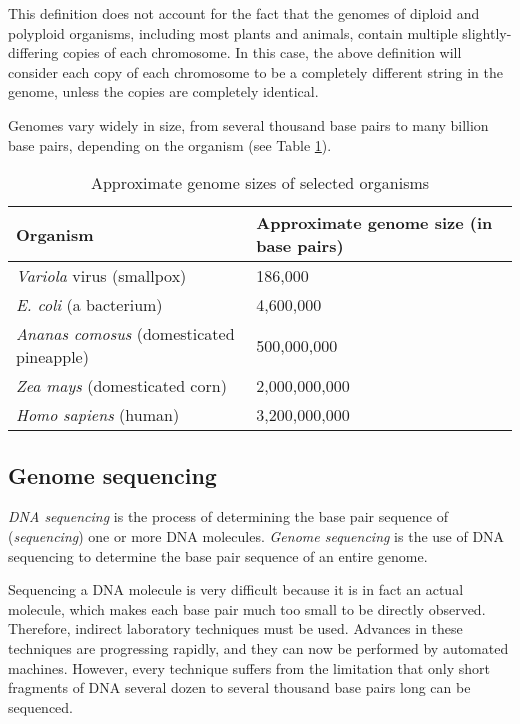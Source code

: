 \documentclass[10pt]{article}
\begin{document}
This definition does not account for the fact that the genomes of diploid and
polyploid organisms, including most plants and animals, contain multiple
slightly-differing copies of each chromosome.  In this case, the above
definition will consider each copy of each chromosome to be a completely
different string in the genome, unless the copies are completely identical.

Genomes vary widely in size, from several thousand base pairs to many billion
base pairs, depending on the organism (see Table \ref{tab:GenomeSizes}).

\begin{table}[H]
	\begin{center}
		\begin{tabular}{|l|p{4.5cm}|}
			\hline
			{\bf Organism} & {\bf Approximate genome size (in base
			pairs)} \\
			\hline
			{\it Variola} virus (smallpox) &  186,000 \\
			\hline
			{\it E. coli} (a bacterium) & 4,600,000 \\
			\hline
			{\it Ananas comosus} (domesticated pineapple) & 500,000,000 \\
			\hline
			{\it Zea mays} (domesticated corn) & 2,000,000,000 \\
			\hline
			{\it Homo sapiens} (human)       &  3,200,000,000 \\
			\hline
		\end{tabular}
	\end{center}
	\caption{Approximate genome sizes of selected organisms}
	\label{tab:GenomeSizes}
\end{table}

\subsection{Genome sequencing}

{\it DNA sequencing} is the process of determining the base pair sequence of
({\it sequencing}) one or more DNA molecules.  {\it Genome sequencing} is the use
of DNA sequencing to determine the base pair sequence of an entire genome.

Sequencing a DNA molecule is very difficult because it is in fact an actual
molecule, which makes each base pair much too small to be directly observed.
Therefore, indirect laboratory techniques must be used.  Advances in these
techniques are progressing rapidly, and they can now be performed by automated
machines.  However, every technique suffers from the limitation that only short
fragments of DNA several dozen to several thousand base pairs long can be
sequenced.
\end{document}

